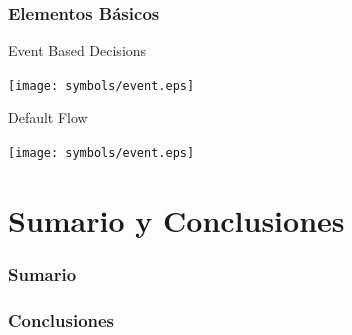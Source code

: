 \documentclass[a4paper,slidestop,xcolor=pst,blue]{beamer}
\begin{document}
\begin{frame}[c]
    \frametitle{Elementos Básicos}
    \begin{block}{Event Based Decisions}
        \ \\
        \begin{center}
            \texttt{[image: symbols/event.eps]}
        \end{center}
    \end{block}
    \begin{block}{Default Flow}
        \ \\
        \begin{center}
            \texttt{[image: symbols/event.eps]}
        \end{center}
    \end{block}

\end{frame}




\section{Sumario y Conclusiones}

\begin{frame}[c]
    \frametitle{Sumario}
\end{frame}

\begin{frame}[c]
    \frametitle{Conclusiones}
\end{frame}
\end{document}
